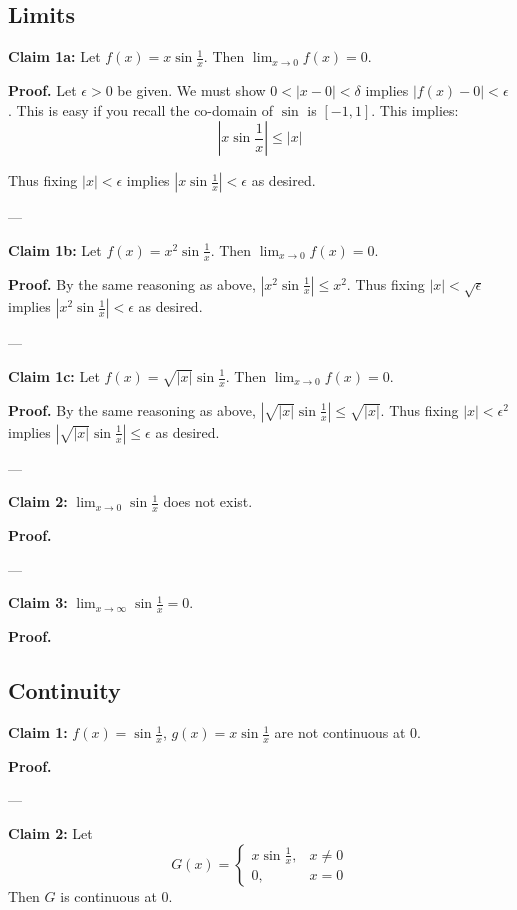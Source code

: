 \clearpage
\subsection{Limits}

\textbf{Claim 1a:} Let $f(x)=x\sin \frac{1}{x}$. Then
$\lim_{x\to0}f(x)=0$.

\textbf{Proof.} Let $\epsilon>0$ be given. We must show
$0<|x-0|<\delta$ implies $|f(x)-0|<\epsilon$. This is easy if you recall
the co-domain of $\sin$ is $[-1,1]$. This implies:
\[\left|x\sin \frac{1}{x}\right|\leq |x|\]

Thus fixing $|x|<\epsilon$ implies
$\left|x\sin \frac{1}{x}\right|<\epsilon$ as desired.



\vs---\vs

\textbf{Claim 1b:} Let $f(x)=x^2\sin \frac{1}{x}$. Then
$\lim_{x\to0}f(x)=0$.

\textbf{Proof.} By the same reasoning as above,
$\left|x^2\sin \frac{1}{x}\right|\leq x^2$. Thus fixing $|x|<\sqrt{\epsilon}$
implies $\left|x^2\sin \frac{1}{x}\right|<\epsilon$ as desired.

\vs---\vs

\textbf{Claim 1c:} Let $f(x)=\sqrt{|x|}\sin \frac{1}{x}$. Then
$\lim_{x\to0}f(x)=0$.

\textbf{Proof.} By the same reasoning as above,
$\left|\sqrt{|x|}\sin \frac{1}{x}\right|\leq \sqrt{|x|}$. Thus fixing
$|x|<\epsilon^2$ implies
$\left|\sqrt{|x|}\sin \frac{1}{x}\right|\leq \epsilon$ as desired.


\vs---\vs

\textbf{Claim 2:} $\lim_{x\to0}\sin \frac{1}{x}$ does not exist.

\textbf{Proof.}

\vs---\vs

\textbf{Claim 3:} $\lim_{x\to\infty}\sin \frac{1}{x}=0$.

\textbf{Proof.}

\subsection{Continuity}

\textbf{Claim 1:} $f(x)=\sin \frac{1}{x}$, $g(x)=x\sin \frac{1}{x}$ are not continuous at $0$.

\textbf{Proof.}

\vs---\vs

\textbf{Claim 2:} Let
\[G(x)=\begin{cases}
  x\sin \frac{1}{x},&x\neq0\\
  0,&x=0
\end{cases}\]
Then $G$ is continuous at $0$.

